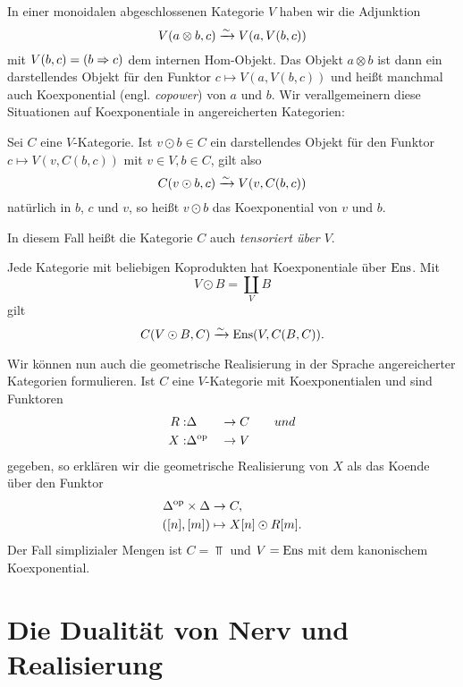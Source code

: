 In einer monoidalen abgeschlossenen Kategorie $V$ haben wir die
Adjunktion
\[ V(a \otimes b, c) \xrightarrow[]{\sim} V(a, V(b, c)) \]
mit $V(b, c) = (b \Rightarrow c)$ dem internen Hom-Objekt. Das Objekt $a
\otimes b$ ist dann ein darstellendes Objekt für den Funktor $c
\mapsto V(a, V(b, c))$ und heißt manchmal auch Koexponential
(engl. \emph{copower}) von $a$ und $b$. Wir verallgemeinern diese
Situationen auf Koexponentiale in angereicherten Kategorien:
\begin{defn} \label{def:copower}
  Sei $C$ eine $V$-Kategorie. Ist $v \odot b \in C$ ein darstellendes
  Objekt für den Funktor $c \mapsto V(v, C(b, c))$ mit $v \in V, b \in
  C$, gilt also
  \[ C(v \odot b, c) \xrightarrow[]{\sim} V(v, C(b, c)) \]
  natürlich in $b$, $c$ und $v$, so heißt $v \odot b$ das
  Koexponential von $v$ und $b$.
\end{defn}
In diesem Fall heißt die Kategorie $C$ auch \emph{tensoriert über
  $V$}.
\begin{bsp} \label{ens-tensored}
  Jede Kategorie mit beliebigen Koprodukten hat Koexponentiale über
  $\operatorname{Ens}$. Mit
  \[ V \odot B = \coprod_V B \]
  gilt
  \[ C(V \odot B, C) \xrightarrow[]{\sim} \operatorname{Ens}(V, C(B, C)). \]
\end{bsp}

Wir können nun auch die geometrische Realisierung in der Sprache
angereicherter Kategorien formulieren. Ist $C$ eine $V$-Kategorie mit
Koexponentialen und sind Funktoren
\begin{alignat*}{2}
  R: &\Delta &&\to C \qquad{und} \\
  X: &\Delta^\mathrm{op} &&\to V
\end{alignat*}
gegeben, so erklären wir die geometrische Realisierung von $X$ als das
Koende über den Funktor
\begin{align*}
  \Delta^\mathrm{op} \times \Delta &\to C, \\
  ([n], [m]) &\mapsto X[n] \odot R[m].
\end{align*}
Der Fall simplizialer Mengen ist $C = \Top$ und $V = \operatorname{Ens}$ mit dem
kanonischem Koexponential.

\section{Die Dualität von Nerv und Realisierung}
\label{sec:nerve}

